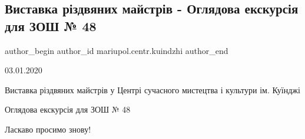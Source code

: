  
 
 
 
 

\subsection{Виставка різдвяних майстрів - Оглядова екскурсія для ЗОШ № 48}
\label{sec:03_01_2020.fb.mariupol.centr.kuindzhi.2.vystavka_rizdvjanyh_majstriv_ogljadova_ekskursia_shkola_48}

\ifcmt
 author_begin
   author_id mariupol.centr.kuindzhi
 author_end
\fi

03.01.2020

Виставка різдвяних майстрів у Центрі сучасного мистецтва і культури ім. Куїнджі

Оглядова екскурсія для ЗОШ № 48

Ласкаво просимо знову!
